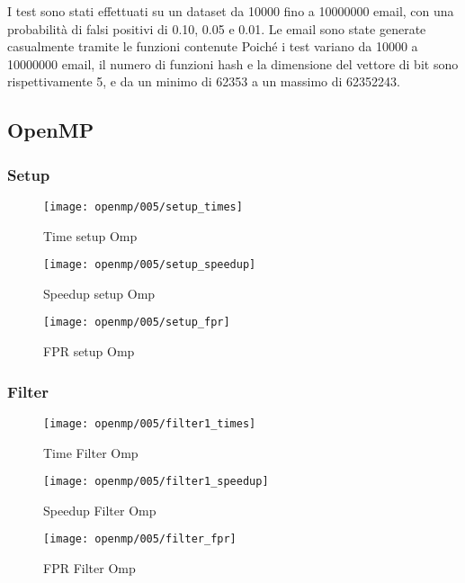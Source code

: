 I test sono stati effettuati su un dataset da 10000 fino a 10000000 email, con una probabilità di falsi positivi di
0.10, 0.05 e 0.01.
Le email sono state generate casualmente tramite le funzioni contenute
Poiché i test variano da 10000 a 10000000 email, il numero di funzioni hash e la dimensione del vettore di bit sono
rispettivamente 5, e da un minimo di 62353 a un massimo di 62352243.

\subsection{OpenMP}\label{subsec:openmp-test}
\subsubsection{Setup}\label{subsubsec:openmp-setup}
\begin{figure}[H]
    \centering
    \texttt{[image: openmp/005/setup\_times]}
        \caption{Time setup Omp}\label{fig:005-setup_time_omp}
    \endminipage\hfill
    \texttt{[image: openmp/005/setup\_speedup]}
        \caption{Speedup setup Omp}\label{fig:005-setup_speedup_omp}
    \endminipage\hfill
\end{figure}
\begin{figure}[H]
    \centering
    \texttt{[image: openmp/005/setup\_fpr]}
        \caption{FPR setup Omp}\label{fig:005-setup_fpr_omp}
    \endminipage\hfill
\end{figure}

\subsubsection{Filter}\label{subsubsec:fpr-005-filter}
\begin{figure}[H]
    \centering
    \texttt{[image: openmp/005/filter1\_times]}
        \caption{Time Filter Omp}\label{fig:005-filter_time_omp}
    \endminipage\hfill
    \texttt{[image: openmp/005/filter1\_speedup]}
        \caption{Speedup Filter Omp}\label{fig:005-filter_speedup_omp}
    \endminipage\hfill
\end{figure}
\begin{figure}[H]
    \centering
    \texttt{[image: openmp/005/filter\_fpr]}
        \caption{FPR Filter Omp}\label{fig:005-filter_fpr_omp}
    \endminipage\hfill
\end{figure}


